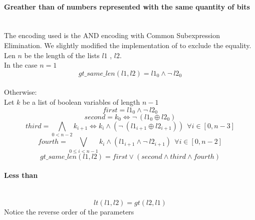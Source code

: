   \paragraph*{Greather than of numbers represented with the same quantity of bits}  \hfill \\
    The encoding used is the AND encoding with Common Subexpression Elimination. We slightly
    modified the implementation of \cite{Zhao} to exclude the equality.\\
    Len \(n\)  be the length of the lists \(l1\) , \(l2\).\\
    In the case \(n = 1\) 
    \begin{equation*}
      gt\_same\_len(l1, l2) = l1_0 \land \neg \ l2_0
    \end{equation*}\\

    Otherwise:\\
    Let \(k\)  be a list of boolean variables of length \(n-1\) 
    \begin{equation*}
      first =  l1_0 \land \neg \ l2_0 %
    \end{equation*}
    \begin{equation*}
      second = k_0 \Longleftrightarrow \neg \ (l1_0 \oplus l2_0) %
    \end{equation*}
    \begin{equation*}
      third = \bigwedge_{0 < n-2} k_{i+1} \Longleftrightarrow k_i \land (\neg \ (l1_{i+1} \oplus l2_{i+1})) \ \ \forall i \in [0, n-3]
    \end{equation*}
    \begin{equation*}
      fourth = \bigvee_{0 \leq i < n-1} k_i \land (l1_{i+1} \land \neg \ l2_{i+1})  \ \ \forall i \in [0, n-2]
    \end{equation*}
    \begin{equation*}
      gt\_same\_len(l1, l2) = first \lor (second \land third \land fourth)
    \end{equation*}

  \paragraph*{Less than} \hfill \\
    \begin{equation*}
      lt(l1, l2) = gt(l2, l1) %
    \end{equation*}
    Notice the reverse order of the parameters\\

